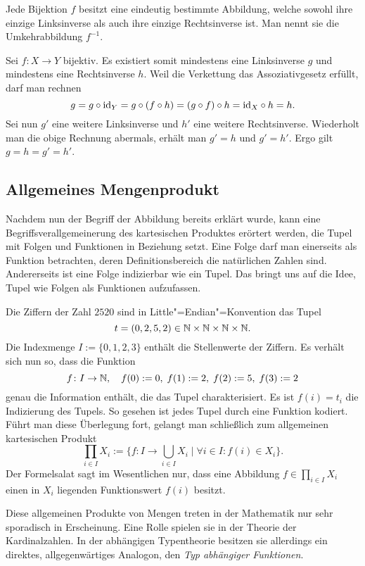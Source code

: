\begin{Satz}
Jede Bijektion $f$ besitzt eine eindeutig bestimmte Abbildung, welche
sowohl ihre einzige Linksinverse als auch ihre einzige Rechtsinverse
ist. Man nennt sie die Umkehrabbildung $f^{-1}$.
\end{Satz}
\begin{Beweis}
Sei $f\colon X\to Y$ bijektiv. Es existiert somit mindestens eine
Linksinverse $g$ und mindestens eine Rechtsinverse $h$. Weil die
Verkettung das Assoziativgesetz erfüllt, darf man rechnen
\[g = g\circ\operatorname{id}_Y = g\circ (f\circ h) = (g\circ f)\circ h
= {\operatorname{id}_X}\circ h = h.\]
Sei nun $g'$ eine weitere Linksinverse und $h'$ eine weitere
Rechtsinverse. Wiederholt man die obige Rechnung abermals, erhält man
$g'=h$ und $g'=h'$. Ergo gilt $g = h = g' = h'$.\,\qedsymbol
\end{Beweis}

\subsection{Allgemeines Mengenprodukt}

Nachdem nun der Begriff der Abbildung bereits erklärt wurde, kann eine
Begriffsverallgemeinerung des kartesischen Produktes erörtert werden,
die Tupel mit Folgen und Funktionen in Beziehung setzt. Eine Folge
darf man einerseits als Funktion betrachten, deren Definitionsbereich
die natürlichen Zahlen sind. Andererseits ist eine Folge indizierbar wie
ein Tupel. Das bringt uns auf die Idee, Tupel wie Folgen als Funktionen
aufzufassen.

Die Ziffern der Zahl $2520$ sind in Little"=Endian"=Konvention das Tupel
\[t=(0,2,5,2)\in\mathbb N\times\mathbb N\times\mathbb N\times\mathbb N.\]
Die Indexmenge $I:=\{0,1,2,3\}$ enthält die Stellenwerte der Ziffern.
Es verhält sich nun so, dass die Funktion
\[f\colon I\to\mathbb N,\quad f(0) := 0,\; f(1) := 2,\; f(2) := 5,\; f(3) := 2\]
genau die Information enthält, die das Tupel charakterisiert. Es ist
$f(i) = t_i$ die Indizierung des Tupels. So gesehen ist jedes Tupel durch
eine Funktion kodiert. Führt man diese Überlegung fort, gelangt man
schließlich zum allgemeinen kartesischen Produkt
\[\prod_{i\in I} X_i := \{f\colon I\to\bigcup_{i\in I} X_i\mid
\forall i\in I\colon f(i)\in X_i\}.\]
Der Formelsalat sagt im Wesentlichen nur, dass eine Abbildung
$f\in\prod_{i\in I} X_i$ einen in $X_i$ liegenden Funktionswert
$f(i)$ besitzt.

Diese allgemeinen Produkte von Mengen treten in der Mathematik nur sehr
sporadisch in Erscheinung. Eine Rolle spielen sie in der Theorie der
Kardinalzahlen. In der abhängigen Typentheorie besitzen sie allerdings ein
direktes, allgegenwärtiges Analogon, den \emph{Typ abhängiger Funktionen}.

